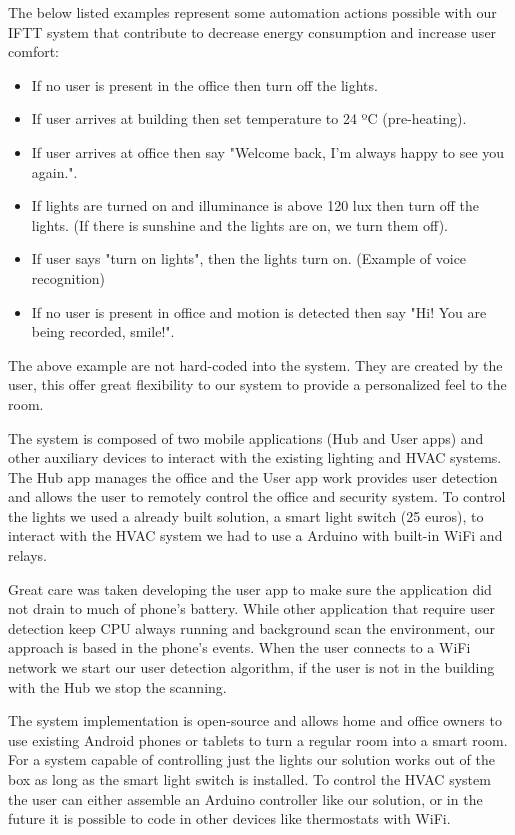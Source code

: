 The below listed examples represent some automation actions possible with our \ac{IFTT} system that contribute to decrease energy consumption and increase user comfort:

\begin{itemize}
\item If no user is present in the office then turn off the lights.
\item If user arrives at building then set temperature to 24 ºC (pre-heating). 
\item If user arrives at office then say "Welcome back, I'm always happy to see you again.".
\item If lights are turned on and illuminance is above 120 lux then turn off the lights. (If there is  sunshine and the lights are on, we turn them off).
\item If user says "turn on lights", then the lights turn on. (Example of voice recognition)
\item If no user is present in office and motion is detected then say "Hi! You are being recorded, smile!".
\end{itemize}

The above example are not hard-coded into the system. They are created by the user, this offer great flexibility to our system to provide a personalized feel to the room.

The system is composed of two mobile applications (Hub and User apps) and other auxiliary devices to interact with the existing lighting and \ac{HVAC} systems. The Hub app manages the office and the User app work provides user detection and allows the user to remotely control the office and security system. To control the lights we used a already built solution, a smart light switch (25 euros), to interact with the \ac{HVAC} system we had to use a Arduino with built-in \ac{WiFi} and relays.

Great care was taken developing the user app to make sure the application did not drain to much of phone's battery. While other application that require user detection keep \ac{CPU} always running and background scan the environment, our approach is based in the phone's events. When the user connects to a \ac{WiFi} network we start our user detection algorithm, if the user is not in the building with the Hub we stop the scanning. 

The system implementation is open-source and allows home and office owners to use existing Android phones or tablets to turn a regular room into a smart room. For a system capable of controlling just the lights our solution works out of the box as long as the smart light switch is installed. To control the \ac{HVAC} system the user can either assemble an Arduino controller like our solution, or in the future it is possible to code in other devices like thermostats with \ac{WiFi}. 

